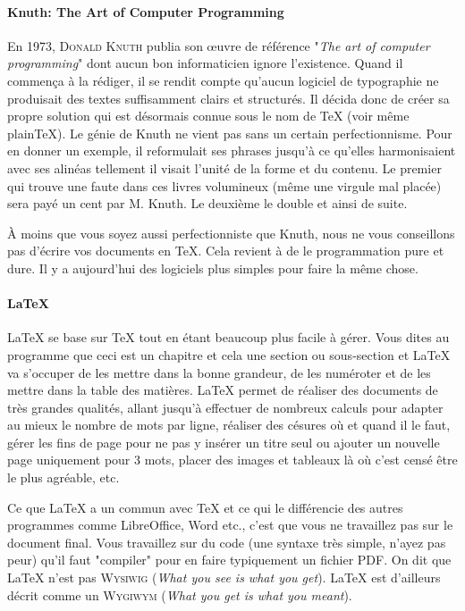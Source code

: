 




\vspace{.2cm}
\paragraph{Knuth: The Art of Computer Programming}
En 1973, \textsc{Donald Knuth} publia son \oe uvre de référence "\textit{The art of computer programming}" dont aucun bon informaticien ignore l'existence. Quand il commença à la rédiger, il se rendit compte qu'aucun logiciel de typographie ne produisait des textes suffisamment clairs et structurés. Il décida donc de créer sa propre solution qui est désormais connue sous le nom de \TeX{} (voir même plain\TeX). Le génie de Knuth ne vient pas sans un certain perfectionnisme. Pour en donner un exemple, il reformulait ses phrases jusqu'à ce qu'elles harmonisaient avec ses alinéas tellement il visait l'unité de la forme et du contenu.
Le premier qui trouve une faute dans ces livres volumineux (même une virgule mal placée) sera payé un cent par M. Knuth. Le deuxième le double et ainsi de suite.

À moins que vous soyez aussi perfectionniste que Knuth, nous ne vous conseillons pas d'écrire vos documents en \TeX. Cela revient à de le programmation pure et dure. Il y a aujourd'hui des logiciels plus simples pour faire la même chose.

\paragraph{LaTeX}
\LaTeX{} se base sur \TeX{} tout en étant beaucoup plus facile à gérer. Vous dites au programme que ceci est un chapitre et cela une section ou sous-section et \LaTeX{} va s'occuper de les mettre dans la bonne grandeur, de les numéroter et de les mettre dans la table des matières. \LaTeX{} permet de réaliser des documents de très grandes qualités, allant jusqu'à effectuer de nombreux calculs pour adapter au mieux le nombre de mots par ligne, réaliser des césures où et quand il le faut, gérer les fins de page pour ne pas y insérer un titre seul ou ajouter un nouvelle page uniquement pour 3 mots, placer des images et tableaux là où c'est censé être le plus agréable, etc.

Ce que \LaTeX{} a un commun avec \TeX{} et ce qui le différencie des autres programmes comme LibreOffice, Word etc., c'est que vous ne travaillez pas sur le document final. Vous travaillez sur du code (une syntaxe très simple, n'ayez pas peur) qu'il faut "compiler" pour en faire typiquement un fichier PDF. On dit que \LaTeX{} n'est pas \textsc{Wysiwig} (\textit{What you see is what you get}). %
\LaTeX{} est d'ailleurs décrit comme un \textsc{Wygiwym} (\textit{What you get is what you meant}).

